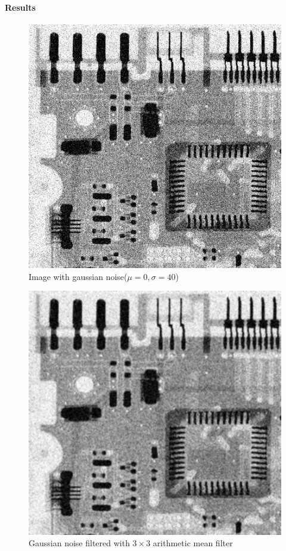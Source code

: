 \documentclass{article}
\begin{document}
\paragraph{Results}
\begin{figure}[H]
	\centering
	\includegraphics[width=336pt]{../result/task2/gauss/gauss-0-40.png}
	\caption{Image with gaussian noise($\mu = 0, \sigma = 40$)}
	\label{fig:gauss}
\end{figure}

\begin{figure}[H]
	\centering
	\includegraphics[width=336pt]{../result/task2/gauss/gauss-arithmetic.png}
	\caption{Gaussian noise filtered with $3 \times 3$ arithmetic mean filter}
	\label{fig:gaussam}
\end{figure}
\end{document}
